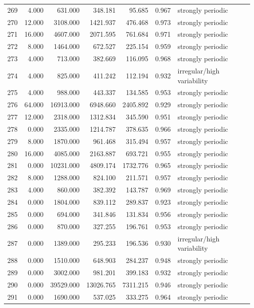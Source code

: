 \begin{longtable}{lrrrrrl}
269 & 4.000 & 631.000 & 348.181 & 95.685 & 0.967 & strongly periodic \\
270 & 12.000 & 3108.000 & 1421.937 & 476.468 & 0.973 & strongly periodic \\
271 & 16.000 & 4607.000 & 2071.595 & 761.684 & 0.971 & strongly periodic \\
272 & 8.000 & 1464.000 & 672.527 & 225.154 & 0.959 & strongly periodic \\
273 & 4.000 & 713.000 & 382.669 & 116.095 & 0.968 & strongly periodic \\
274 & 4.000 & 825.000 & 411.242 & 112.194 & 0.932 & irregular/high variability \\
275 & 4.000 & 988.000 & 443.337 & 134.585 & 0.953 & strongly periodic \\
276 & 64.000 & 16913.000 & 6948.660 & 2405.892 & 0.929 & strongly periodic \\
277 & 12.000 & 2318.000 & 1312.834 & 345.590 & 0.951 & strongly periodic \\
278 & 0.000 & 2335.000 & 1214.787 & 378.635 & 0.966 & strongly periodic \\
279 & 8.000 & 1870.000 & 961.468 & 315.494 & 0.957 & strongly periodic \\
280 & 16.000 & 4085.000 & 2163.887 & 693.721 & 0.955 & strongly periodic \\
281 & 0.000 & 10231.000 & 4809.174 & 1732.776 & 0.965 & strongly periodic \\
282 & 8.000 & 1288.000 & 824.100 & 211.571 & 0.957 & strongly periodic \\
283 & 4.000 & 860.000 & 382.392 & 143.787 & 0.969 & strongly periodic \\
284 & 0.000 & 1804.000 & 839.112 & 289.837 & 0.923 & strongly periodic \\
285 & 0.000 & 694.000 & 341.846 & 131.834 & 0.956 & strongly periodic \\
286 & 0.000 & 870.000 & 327.255 & 196.761 & 0.953 & strongly periodic \\
287 & 0.000 & 1389.000 & 295.233 & 196.536 & 0.930 & irregular/high variability \\
288 & 0.000 & 1510.000 & 648.903 & 284.237 & 0.948 & strongly periodic \\
289 & 0.000 & 3002.000 & 981.201 & 399.183 & 0.932 & strongly periodic \\
290 & 0.000 & 39529.000 & 13026.765 & 7311.215 & 0.946 & strongly periodic \\
291 & 0.000 & 1690.000 & 537.025 & 333.275 & 0.964 & strongly periodic \\

\end{longtable}
